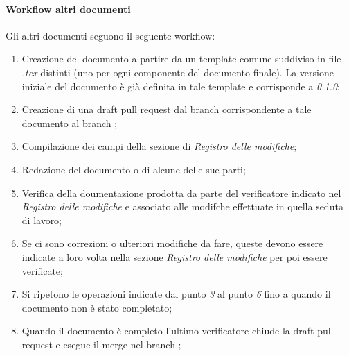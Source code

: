     \paragraph{Workflow altri documenti}
    Gli altri documenti seguono il seguente workflow:
    \begin{enumerate}
        \item Creazione del documento a partire da un template comune 
        suddiviso in file \textit{.tex} distinti (uno per ogni componente del 
        documento finale). La versione iniziale del documento è già 
        definita in tale template e corrisponde a \textit{0.1.0};
        \item Creazione di una draft pull request dal branch corrispondente 
        a tale documento al branch ;
        \item Compilazione dei campi della sezione di \textit{Registro 
        delle modifiche};
        \item Redazione del documento o di alcune delle sue parti;
        \item Verifica della doumentazione prodotta da parte del verificatore 
        indicato nel \textit{Registro delle modifiche} e associato alle modifche 
        effettuate in quella seduta di lavoro;
        \item Se ci sono correzioni o ulteriori modifiche da fare, queste 
        devono essere indicate a loro volta nella sezione 
        \textit{Registro delle modifiche} per poi essere verificate;
        \item Si ripetono le operazioni indicate dal punto \textit{3} al punto 
        \textit{6} fino a quando il documento non è stato completato;
        \item Quando il documento è completo l'ultimo verificatore 
        chiude la draft pull request e esegue il merge nel branch ;
    \end{enumerate}
